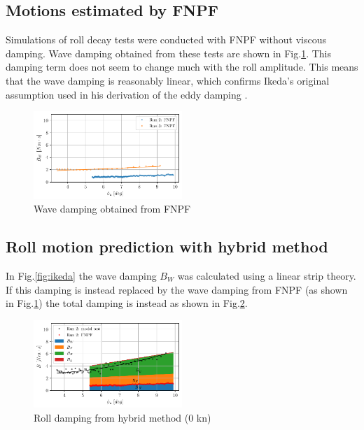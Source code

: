     \subsection*{Motions estimated by FNPF}\label{motions-estimated-by-fnpf}

Simulations of roll decay tests were conducted with FNPF without viscous
damping. Wave damping obtained from these tests are shown in
Fig.\ref{fig:fnpf}. This damping term does not seem to change
much with the roll amplitude. This means that the wave damping is
reasonably linear, which confirms Ikeda's original assumption used in
his derivation of the eddy damping \citep{7505983/4AFVVGNT}.

    

    \begin{figure}[H]
        \begin{center}\includegraphics[width = 0.5\textwidth]{figures/fnpf.pdf}\end{center}
        \vspace{-1cm}
        \caption{Wave damping obtained from FNPF}
        \label{fig:fnpf}
    \end{figure}
    
    \subsection*{Roll motion prediction with hybrid
method}\label{roll-motion-prediction-with-hybrid-method}

    In Fig.\ref{fig:ikeda} the wave damping $B_W$ was calculated
using a linear strip theory. If this damping is instead replaced by the
wave damping from FNPF (as shown in Fig.\ref{fig:fnpf}) the
total damping is instead as shown in Fig.\ref{fig:hybrid_0}.

    

    \begin{figure}[H]
        \begin{center}\includegraphics[width = 0.5\textwidth]{figures/hybrid_0.pdf}\end{center}
        \vspace{-1cm}
        \caption{Roll damping from hybrid method (0 kn)}
        \label{fig:hybrid_0}
    \end{figure}
    
